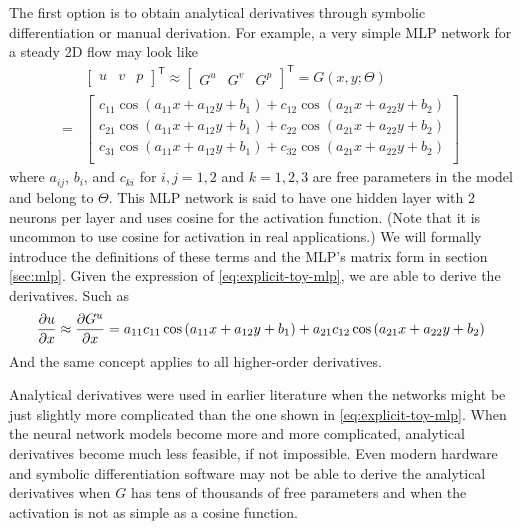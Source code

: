 The first option is to obtain analytical derivatives through symbolic differentiation or manual derivation.
For example, a very simple MLP network for a steady 2D flow may look like
\begin{equation}\label{eq:explicit-toy-mlp}
    \begin{aligned}
    &\begin{bmatrix}
        u &
        v &
        p
    \end{bmatrix}^\mathsf{T}
    \approx
    \begin{bmatrix}
        G^u &
        G^v &
        G^p
    \end{bmatrix}^\mathsf{T}
    =
    G(x, y; \Theta) \\
    = 
    &\begin{bmatrix}
    c_{11} \cos{\left(a_{11}x + a_{12}y + b_1\right)} + 
      c_{12} \cos{\left(a_{21}x + a_{22}y + b_2\right)} \\
    c_{21} \cos{\left(a_{11}x + a_{12}y + b_1\right)} + 
      c_{22} \cos{\left(a_{21}x + a_{22}y + b_2\right)} \\
    c_{31} \cos{\left(a_{11}x + a_{12}y + b_1\right)} + 
      c_{32} \cos{\left(a_{21}x + a_{22}y + b_2\right)} \\
    \end{bmatrix}
    \end{aligned}
\end{equation}
where $a_{ij}$, $b_i$, and $c_{ki}$ for $i,j=1,2$ and $k=1,2,3$ are free parameters in the model and belong to $\Theta$.
This MLP network is said to have one hidden layer with 2 neurons per layer and uses cosine for the activation function.
(Note that it is uncommon to use cosine for activation in real applications.)
We will formally introduce the definitions of these terms and the MLP's matrix form in section \ref{sec:mlp}.
Given the expression of \eqref{eq:explicit-toy-mlp}, we are able to derive the derivatives.
Such as
\begin{equation}
    \begin{aligned}
    \frac{\partial u}{\partial x}
    \approx
    \frac{\partial G^u}{\partial x}
    =
    a_{11}c_{11}\cos\left(a_{11}x + a_{12}y + b_1\right) + a_{21}c_{12}\cos\left(a_{21}x + a_{22}y + b_2\right)
    \end{aligned}
\end{equation}
And the same concept applies to all higher-order derivatives.

Analytical derivatives were used in earlier literature when the networks might be just slightly more complicated than the one shown in \eqref{eq:explicit-toy-mlp}.
When the neural network models become more and more complicated, analytical derivatives become much less feasible, if not impossible.
Even modern hardware and symbolic differentiation software may not be able to derive the analytical derivatives when $G$ has tens of thousands of free parameters and when the activation is not as simple as a cosine function.

